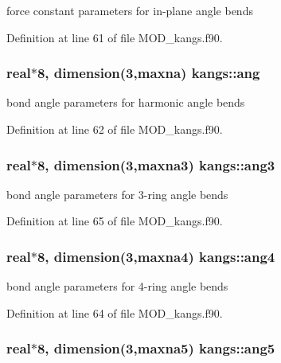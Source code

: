 force constant parameters for in-\/plane angle bends 



Definition at line 61 of file M\-O\-D\-\_\-kangs.\-f90.

\hypertarget{classkangs_a23c8d00fd92495d816a68a4a1d952282}{
\subsubsection[{ang}]{\setlength{\rightskip}{0pt plus 5cm}real$\ast$8, dimension(3,{\bf maxna}) kangs\-::ang}}\label{classkangs_a23c8d00fd92495d816a68a4a1d952282}


bond angle parameters for harmonic angle bends 



Definition at line 62 of file M\-O\-D\-\_\-kangs.\-f90.

\hypertarget{classkangs_a8eeaafcb58d09511629476c3cd84baaa}{
\subsubsection[{ang3}]{\setlength{\rightskip}{0pt plus 5cm}real$\ast$8, dimension(3,{\bf maxna3}) kangs\-::ang3}}\label{classkangs_a8eeaafcb58d09511629476c3cd84baaa}


bond angle parameters for 3-\/ring angle bends 



Definition at line 65 of file M\-O\-D\-\_\-kangs.\-f90.

\hypertarget{classkangs_a88c492e1327f859f7873b031372b16fe}{
\subsubsection[{ang4}]{\setlength{\rightskip}{0pt plus 5cm}real$\ast$8, dimension(3,{\bf maxna4}) kangs\-::ang4}}\label{classkangs_a88c492e1327f859f7873b031372b16fe}


bond angle parameters for 4-\/ring angle bends 



Definition at line 64 of file M\-O\-D\-\_\-kangs.\-f90.

\hypertarget{classkangs_a4577e70383dba9f6dd8ab2d98463f2b1}{
\subsubsection[{ang5}]{\setlength{\rightskip}{0pt plus 5cm}real$\ast$8, dimension(3,{\bf maxna5}) kangs\-::ang5}}\label{classkangs_a4577e70383dba9f6dd8ab2d98463f2b1}


